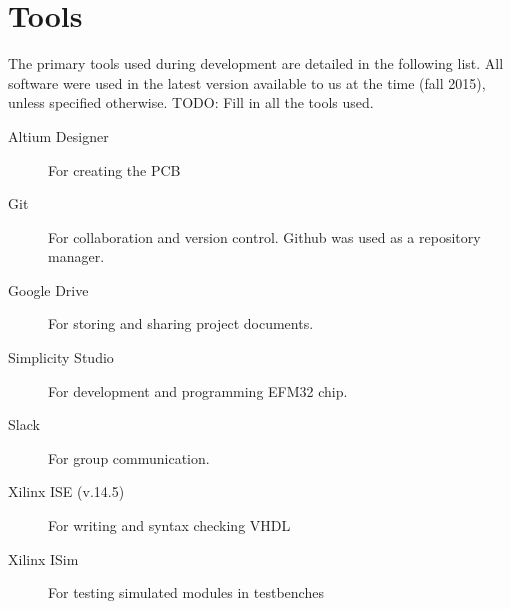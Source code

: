 \chapter{Tools}
The primary tools used during development are detailed in the following list. All software were used in the latest version available to us at the time (fall 2015), unless specified otherwise.
TODO: Fill in all the tools used.

\begin{description}
    \item[Altium Designer] For creating the PCB
    \item[Git] For collaboration and version control. Github was used as a repository manager.
    \item[Google Drive] For storing and sharing project documents.
    \item[Simplicity Studio] For development and programming EFM32 chip.
    \item[Slack] For group communication.
    \item[Xilinx ISE (v.14.5)] For writing and syntax checking VHDL
    \item[Xilinx ISim] For testing simulated modules in testbenches
\end{description}
